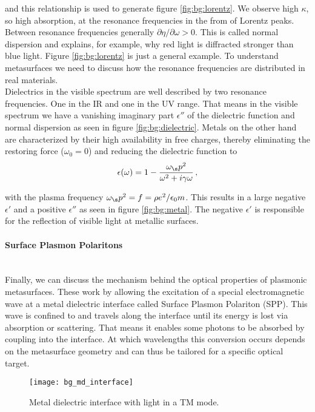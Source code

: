 and this relationship is used to generate figure \ref{fig:bg:lorentz}. We observe high $\kappa$, so high absorption, at the resonance frequencies in the from of Lorentz peaks. Between resonance frequencies generally 
$\partial \eta / \partial \omega > 0$.
This is called normal dispersion and explains, for example, why red light is diffracted stronger than blue light.
Figure \ref{fig:bg:lorentz} is just a general example. To understand metasurfaces we need to discuss how the resonance frequencies are distributed in real materials.
\\

\indent
Dielectrics in the visible spectrum are well described by two resonance frequencies. One in the IR and one in the UV range. That means in the visible spectrum we have a vanishing imaginary part $\epsilon''$ of the dielectric function and normal dispersion as seen in figure \ref{fig:bg:dielectric}. 
Metals on the other hand are characterized by their high availability in free charges, thereby eliminating the restoring force ($\omega_0 = 0$) and reducing the dielectric function to 
\begin{equation}
    \epsilon(\omega) = 1 - \frac{\omega_\s p^2}{\omega^2 + i \gamma \omega}\, ,
\end{equation}

with the plasma frequency 
$\omega_\s p^2 = f = \rho e^2 / \epsilon_0 m$.
This results in a large negative $\epsilon'$ and a positive $\epsilon''$ as seen in figure \ref{fig:bg:metal}. The negative $\epsilon'$ is responsible for the reflection of visible light at metallic surfaces.

\paragraph{Surface Plasmon Polaritons}~\\
Finally, we can discuss the mechanism behind the optical properties of plasmonic metasurfaces. These work by allowing the excitation of a special electromagnetic wave at a metal dielectric interface called Surface Plasmon Polariton (SPP). This wave is confined to and travels along the interface until its energy is lost via absorption or scattering. That means it enables some photons to be absorbed by coupling into the interface. At which wavelengths this conversion occurs depends on the metasurface geometry and can thus be tailored for a specific optical target.

\begin{figure}[H]
    \centering
    \texttt{[image: bg\_md\_interface]}
    \caption{Metal dielectric interface with light in a TM mode.}
    \label{fig:bg:md_inderface}
\end{figure}

